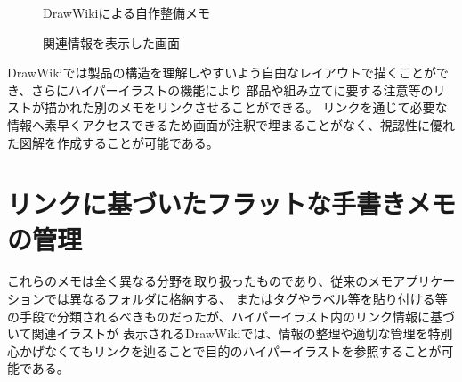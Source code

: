 \begin{figure}[H] \begin{minipage}{0.5\hsize}
                      \begin{center} 
                      \end{center} \caption{DrawWikiによる自作整備メモ} \label{fig:oremanual1}
\end{minipage} \begin{minipage}{0.5\hsize}
                   \begin{center} 
                   \end{center} \caption{関連情報を表示した画面} \label{fig:oremanual2}
\end{minipage}
\end{figure}

DrawWikiでは製品の構造を理解しやすいよう自由なレイアウトで描くことができ、さらにハイパーイラストの機能により
部品や組み立てに要する注意等のリストが描かれた別のメモをリンクさせることができる。
リンクを通じて必要な情報へ素早くアクセスできるため画面が注釈で埋まることがなく、視認性に優れた図解を作成することが可能である。


\section{リンクに基づいたフラットな手書きメモの管理}
これらのメモは全く異なる分野を取り扱ったものであり、従来のメモアプリケーションでは異なるフォルダに格納する、
またはタグやラベル等を貼り付ける等の手段で分類されるべきものだったが、ハイパーイラスト内のリンク情報に基づいて関連イラストが
表示されるDrawWikiでは、情報の整理や適切な管理を特別心かげなくてもリンクを辿ることで目的のハイパーイラストを参照することが可能である。

